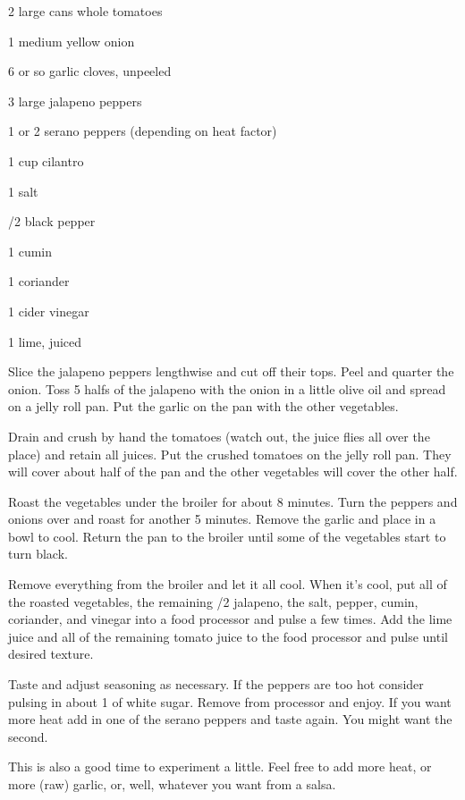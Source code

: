 \begin{IngredientsAndSteps}
    \ListIngredientsAndSteps
    {
        2 large cans whole tomatoes

        1 medium yellow onion

        6 or so garlic cloves, unpeeled

        3 large jalapeno peppers

        1 or 2 serano peppers (depending on heat factor)

        1 cup cilantro

        1 \tsp salt

        /2 \tsp black pepper

        1 \tsp cumin

        1 \tsp coriander

        1 \tsp cider vinegar

        1 lime, juiced
    }
    {
        Slice the jalapeno peppers lengthwise and cut off their tops. Peel and
        quarter the onion. Toss 5 halfs of the jalapeno with the onion in a
        little olive oil and spread on a jelly roll pan. Put the garlic on the
        pan with the other vegetables.

        Drain and crush by hand the tomatoes (watch out, the juice flies all
        over the place) and retain all juices. Put the crushed tomatoes on the
        jelly roll pan. They will cover about half of the pan and the other
        vegetables will cover the other half.

        Roast the vegetables under the broiler for about 8 minutes. Turn the
        peppers and onions over and roast for another 5 minutes. Remove the
        garlic and place in a bowl to cool. Return the pan to the broiler until
        some of the vegetables start to turn black.

        Remove everything from the broiler and let it all cool. When it's cool,
        put all of the roasted vegetables, the remaining /2 jalapeno, the salt,
        pepper, cumin, coriander, and vinegar into a food processor and pulse a
        few times. Add the lime juice and all of the remaining tomato juice to the
        food processor and pulse until desired texture.

        Taste and adjust seasoning as necessary. If the peppers are too hot
        consider pulsing in about 1 \tsp of white sugar. Remove from processor
        and enjoy. If you want more heat add in one of the serano peppers and taste
        again. You might want the second.

        This is also a good time to experiment a little. Feel free to add more heat,
        or more (raw) garlic, or, well, whatever you want from a salsa.
    }
\end{IngredientsAndSteps}

